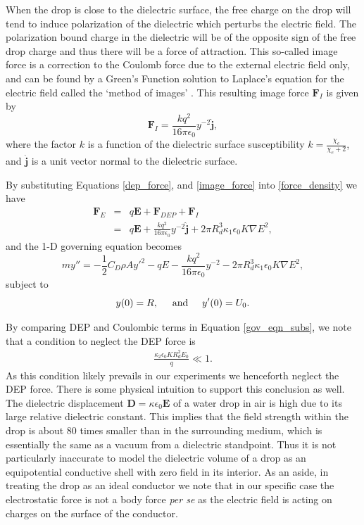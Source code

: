 \documentclass[12pt,a4paper,oneside]{book}
\begin{document}
When the drop is close to the dielectric surface, the free charge on the drop will tend to induce polarization of the dielectric which perturbs the electric field. The polarization bound charge in the dielectric will be of the opposite sign of the free drop charge and thus there will be a force of attraction. This so-called image force is a correction to the Coulomb force due to the external electric field only, and can be found by a Green's Function solution to Laplace's equation for the electric field called the `method of images' \cite{david_j._griffiths_introduction_1999}. This resulting image force $\mathbf{F}_I$ is given by
\begin{equation}
\mathbf{F}_I = \frac{k q^2}{16 \pi \epsilon_0} y^{-2} \hat{\mathbf{j}},
\label{image_force}
\end{equation}
where the factor $k$ is a function of the dielectric surface susceptibility $k = \frac{\chi_e}{\chi_e + 2}$, and $\hat{\mathbf{j}}$ is a unit vector normal to the dielectric surface.

By substituting Equations \ref{dep_force}, and \ref{image_force} into \ref{force_density} we have
\begin{eqnarray*}
 \mathbf{F}_E &=& q \mathbf{E} + \mathbf{F}_{DEP} + \mathbf{F}_I \\
 &=& q \mathbf{E} + \frac{k q^2}{16 \pi \epsilon_0 } y^{-2} \hat{\mathbf{j}} + 2 \pi R_d^3 \kappa_1 \epsilon_0 K \nabla E^2, 
\end{eqnarray*}
and the 1-D governing equation becomes
\begin{equation}
 \label{gov_eqn_subs}
m y'' = - \frac{1}{2} C_D \rho A {y'}^2 - q E - \frac{k q^2}{16 \pi \epsilon_0} y^{-2}- 2 \pi R_d^3 \kappa_1 \epsilon_0 K \nabla E^2,
\end{equation}
subject to
\begin{equation}
y(0) = R, \hspace{5 mm} \mbox{and} \hspace{5 mm} y'(0) = U_0 .
\end{equation}

By comparing DEP and Coulombic terms in Equation \ref{gov_eqn_subs}, we note that a condition to neglect the DEP force is
\begin{eqnarray}
\frac{ \kappa_2 \epsilon_0 K R_d^2 E_0}{q} \ll 1. \nonumber
\end{eqnarray}
As this condition likely prevails in our experiments we henceforth neglect the DEP force. There is some physical intuition to support this conclusion as well. The dielectric displacement $\mathbf{D} = \kappa \epsilon_0 \mathbf{E}$ of a water drop in air is high due to its large relative dielectric constant. This implies that the field strength within the drop is about 80 times smaller than in the surrounding medium, which is essentially the same as a vacuum from a dielectric standpoint. Thus it is not particularly inaccurate to model the dielectric volume of a drop as an equipotential conductive shell with zero field in its interior. As an aside, in treating the drop as an ideal conductor we note that in our specific case the electrostatic force is not a body force \emph{per se} as the electric field is acting on charges on the surface of the conductor.
\end{document}
